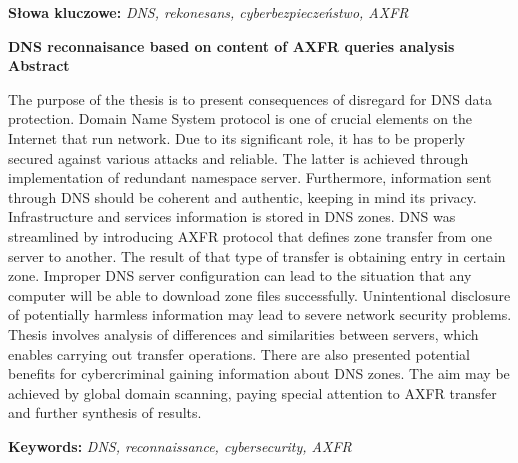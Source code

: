 \noindent\textbf{Słowa kluczowe:} \textit{DNS, rekonesans, cyberbezpieczeństwo, AXFR}\\
\newpage
\afterpage{\blankpage}
\begin{center}
	\fontsize{18pt}{12pt}\selectfont\textbf{DNS reconnaisance based on content of AXFR queries analysis}\\
	\vspace{1cm}
	\fontsize{14pt}{12pt}\selectfont
	\textbf{Abstract}
\end{center}
The purpose of the thesis is to present consequences of disregard for DNS data protection. Domain Name System protocol is one of
crucial elements on the Internet that run network. Due to its significant role, it has to be properly secured against various
attacks and reliable. The latter is achieved through implementation of redundant namespace server. Furthermore, information sent
through DNS should be coherent and authentic, keeping in mind its privacy. Infrastructure and services information is stored in DNS zones.
DNS was streamlined by introducing AXFR protocol that defines zone transfer from one server to another. The result of that type
of transfer is obtaining entry in certain zone. Improper DNS server configuration can lead to the situation that any computer
will be able to download zone files successfully.
Unintentional disclosure of potentially harmless information may lead to severe network security problems.
Thesis involves analysis of differences and similarities between servers, which enables carrying out transfer operations.
There are also presented potential benefits for cybercriminal gaining information about DNS zones.
The aim may be achieved by global domain scanning, paying special attention to AXFR transfer and further synthesis of results.\\
\vspace{1cm}

\noindent\textbf{Keywords:} \textit{DNS, reconnaissance, cybersecurity, AXFR}\\
\vspace{1.5cm}

\newpage

